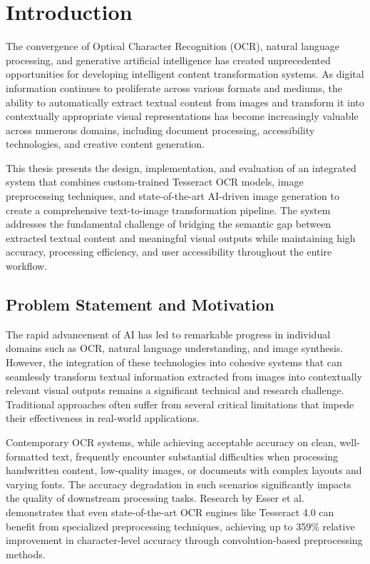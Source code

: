 \chapter{Introduction}

The convergence of Optical Character Recognition (OCR), natural language processing, and generative artificial intelligence has created unprecedented opportunities for developing intelligent content transformation systems. As digital information continues to proliferate across various formats and mediums, the ability to automatically extract textual content from images and transform it into contextually appropriate visual representations has become increasingly valuable across numerous domains, including document processing, accessibility technologies, and creative content generation.

This thesis presents the design, implementation, and evaluation of an integrated system that combines custom-trained Tesseract OCR models, image preprocessing techniques, and state-of-the-art AI-driven image generation to create a comprehensive text-to-image transformation pipeline. The system addresses the fundamental challenge of bridging the semantic gap between extracted textual content and meaningful visual outputs while maintaining high accuracy, processing efficiency, and user accessibility throughout the entire workflow.

\section{Problem Statement and Motivation}

The rapid advancement of AI has led to remarkable progress in individual domains such as OCR, natural language understanding, and image synthesis. However, the integration of these technologies into cohesive systems that can seamlessly transform textual information extracted from images into contextually relevant visual outputs remains a significant technical and research challenge. Traditional approaches often suffer from several critical limitations that impede their effectiveness in real-world applications.

Contemporary OCR systems, while achieving acceptable accuracy on clean, well-formatted text, frequently encounter substantial difficulties when processing handwritten content, low-quality images, or documents with complex layouts and varying fonts. The accuracy degradation in such scenarios significantly impacts the quality of downstream processing tasks. Research by Esser et al. \cite{esser2020improving} demonstrates that even state-of-the-art OCR engines like Tesseract 4.0 can benefit from specialized preprocessing techniques, achieving up to 359\% relative improvement in character-level accuracy through convolution-based preprocessing methods.

